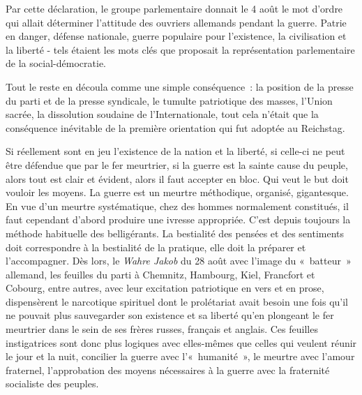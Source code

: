 \documentclass[french,twoside]{book} %
\begin{document}
\noindent Par cette déclaration, le groupe parlementaire donnait le 4 août le mot d’ordre qui allait déterminer l’attitude des ouvriers allemands pendant la guerre. Patrie en danger, défense nationale, guerre populaire pour l’existence, la civilisation et la liberté - tels étaient les mots clés que proposait la représentation parlementaire de la social-démocratie.\par
Tout le reste en découla comme une simple conséquence : la position de la presse du parti et de la presse syndicale, le tumulte patriotique des masses, l’Union sacrée, la dissolution soudaine de l’Internationale, tout cela n’était que la conséquence inévitable de la première orientation qui fut adoptée au Reichstag.\par
Si réellement sont en jeu l’existence de la nation et la liberté, si celle-ci ne peut être défendue que par le fer meurtrier, si la guerre est la sainte cause du peuple, alors tout est clair et évident, alors il faut accepter en bloc. Qui veut le but doit vouloir les moyens. La guerre est un meurtre méthodique, organisé, gigantesque. En vue d’un meurtre systématique, chez des hommes normalement constitués, il faut cependant d’abord produire une ivresse appropriée. C'est depuis toujours la méthode habituelle des belligérants. La bestialité des pensées et des sentiments doit correspondre à la bestialité de la pratique, elle doit la préparer et l’accompagner. Dès lors, le \emph{Wahre Jakob} du 28 août avec l’image du « batteur » allemand, les feuilles du parti à Chemnitz, Hambourg, Kiel, Francfort et Cobourg, entre autres, avec leur excitation patriotique en vers et en prose, dispensèrent le narcotique spirituel dont le prolétariat avait besoin une fois qu’il ne pouvait plus sauvegarder son existence et sa liberté qu’en plongeant le fer meurtrier dans le sein de ses frères russes, français et anglais. Ces feuilles instigatrices sont donc plus logiques avec elles-mêmes que celles qui veulent réunir le jour et la nuit, concilier la guerre avec l’« humanité », le meurtre avec l’amour fraternel, l’approbation des moyens nécessaires à la guerre avec la fraternité socialiste des peuples.\par
\end{document}
